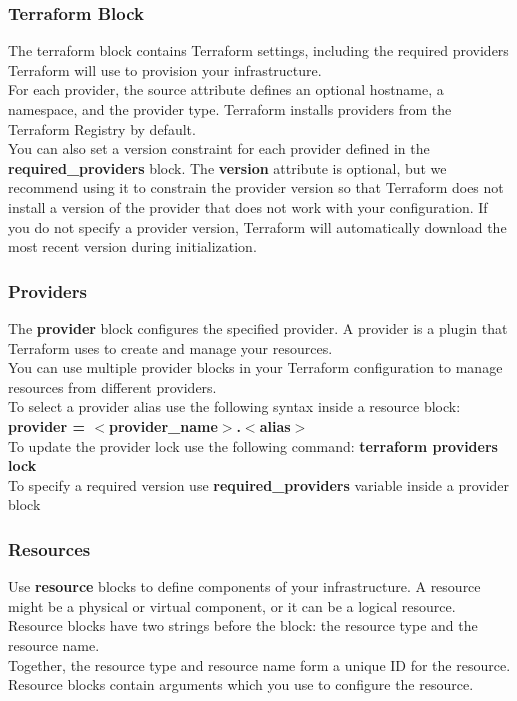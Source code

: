 \documentclass[12pt, letterpaper, twoside]{article}
\begin{document}
\subsubsection{Terraform Block}
The terraform {} block contains Terraform settings, including the required providers 
Terraform will use to provision your infrastructure.\\
For each provider, the source attribute defines an optional hostname, a namespace, and
the provider type. Terraform installs providers from the Terraform Registry by default.\\

You can also set a version constraint for each provider defined in the 
\textbf{required\_providers} block. The \textbf{version} attribute is optional, but we recommend using 
it to constrain the provider version so that Terraform does not install a version of the provider 
that does not work with your configuration. If you do not specify a provider version, 
Terraform will automatically download the most recent version during initialization.

\subsubsection{Providers}
The \textbf{provider} block configures the specified provider. A provider is a plugin 
that Terraform uses to create and manage your resources.\\
You can use multiple provider blocks in your Terraform configuration to manage 
resources from different providers.\\

To select a provider alias use the following syntax inside a resource block:\\
\textbf{provider = $<$provider\_name$>$.$<$alias$>$}\\

To update the provider lock use the following command: \textbf{terraform providers lock}\\

To specify a required version use \textbf{required\_providers} variable inside a provider block

\subsubsection{Resources}
Use \textbf{resource} blocks to define components of your infrastructure. A resource might be a physical or virtual component,
or it can be a logical resource.\\
Resource blocks have two strings before the block: the resource type and the resource name.\\
Together, the resource type and resource name form a unique ID for the resource.\\
Resource blocks contain arguments which you use to configure the resource.\\
\end{document}
